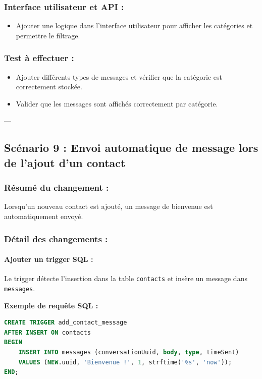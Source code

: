 \documentclass[a4paper,11pt]{article}
\begin{document}
\subsubsection*{Interface utilisateur et API :}
\begin{itemize}
    \item Ajouter une logique dans l’interface utilisateur pour afficher les catégories et permettre le filtrage.
\end{itemize}

\subsubsection*{Test à effectuer :}
\begin{itemize}
    \item Ajouter différents types de messages et vérifier que la catégorie est correctement stockée.
    \item Valider que les messages sont affichés correctement par catégorie.
\end{itemize}

---

\subsection*{Scénario 9 : Envoi automatique de message lors de l’ajout d’un contact}

\subsubsection*{Résumé du changement :}
Lorsqu’un nouveau contact est ajouté, un message de bienvenue est automatiquement envoyé.

\subsubsection*{Détail des changements :}

\paragraph{Ajouter un trigger SQL :}
Le trigger détecte l’insertion dans la table \texttt{contacts} et insère un message dans \texttt{messages}.

\textbf{Exemple de requête SQL :}
\begin{lstlisting}[language=SQL]
CREATE TRIGGER add_contact_message 
AFTER INSERT ON contacts
BEGIN
    INSERT INTO messages (conversationUuid, body, type, timeSent)
    VALUES (NEW.uuid, 'Bienvenue !', 1, strftime('%s', 'now'));
END;
\end{lstlisting}
\end{document}
